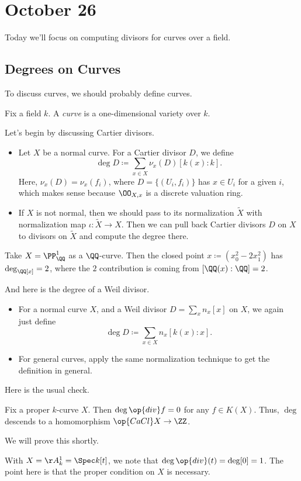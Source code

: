 \documentclass[../notes.tex]{subfiles}
\begin{document}
\section{October 26}

Today we'll focus on computing divisors for curves over a field.

\subsection{Degrees on Curves}
To discuss curves, we should probably define curves.
\begin{definition}[Curve]
	Fix a field $k$. A \textit{curve} is a one-dimensional variety over $k$.
\end{definition}
Let's begin by discussing Cartier divisors.
\begin{itemize}
	\item Let $X$ be a normal curve. For a Cartier divisor $D$, we define
	\[\deg D\coloneqq\sum_{x\in X}\nu_x(D)[k(x):k].\]
	Here, $\nu_x(D)=\nu_x(f_i)$, where $D=\{(U_i,f_i)\}$ has $x\in U_i$ for a given $i$, which makes sense because $\OO_{X,x}$ is a discrete valuation ring.
	\item If $X$ is not normal, then we should pass to its normalization $\widetilde X$ with normalization map $\iota\colon\widetilde X\to X$. Then we can pull back Cartier divisors $D$ on $X$ to divisors on $\widetilde X$ and compute the degree there.
\end{itemize}
\begin{example}
	Take $X=\PP^1_\QQ$ as a $\QQ$-curve. Then the closed point $x\coloneqq\left(x_0^2-2x_1^2\right)$ has $\deg_\QQ[x]=2$, where the $2$ contribution is coming from $[\QQ(x):\QQ]=2$.
\end{example}
And here is the degree of a Weil divisor.
\begin{itemize}
	\item For a normal curve $X$, and a Weil divisor $D=\sum_xn_x[x]$ on $X$, we again just define
	\[\deg D\coloneqq\sum_{x\in X}n_x[k(x):x].\]
	\item For general curves, apply the same normalization technique to get the definition in general.
\end{itemize}
Here is the usual check.
\begin{prop} \label{prop:deg-of-princ-vanishes}
	Fix a proper $k$-curve $X$. Then $\deg\op{div}f=0$ for any $f\in K(X)$. Thus, $\deg$ descends to a homomorphism $\op{CaCl}X\to\ZZ$.
\end{prop}
We will prove this shortly.
\begin{nex}
	With $X=\AA^1_k=\Spec k[t]$, we note that $\deg\op{div}(t)=\deg[0]=1$. The point here is that the proper condition on $X$ is necessary.
\end{nex}
\end{document}
